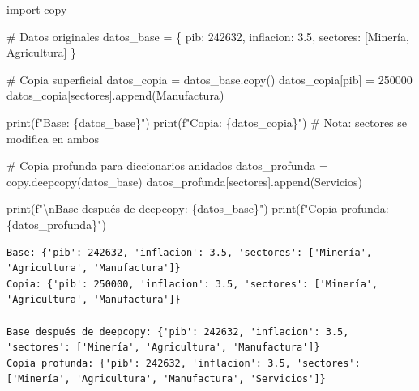 \documentclass[
  doc,
  floatsintext,
  longtable,
  a4paper,
  nolmodern,
  notxfonts,
  notimes,
  12pt,
  colorlinks=true,linkcolor=blue,citecolor=blue,urlcolor=blue]{apa7}
\newenvironment{Shaded}{\begin{snugshade}}{\end{snugshade}}
\newcommand{\BuiltInTok}[1]{\textcolor[rgb]{0.00,0.23,0.31}{#1}}
\newcommand{\CharTok}[1]{\textcolor[rgb]{0.13,0.47,0.30}{#1}}
\newcommand{\CommentTok}[1]{\textcolor[rgb]{0.37,0.37,0.37}{#1}}
\newcommand{\DecValTok}[1]{\textcolor[rgb]{0.68,0.00,0.00}{#1}}
\newcommand{\FloatTok}[1]{\textcolor[rgb]{0.68,0.00,0.00}{#1}}
\newcommand{\ImportTok}[1]{\textcolor[rgb]{0.00,0.46,0.62}{#1}}
\newcommand{\NormalTok}[1]{\textcolor[rgb]{0.00,0.23,0.31}{#1}}
\newcommand{\OperatorTok}[1]{\textcolor[rgb]{0.37,0.37,0.37}{#1}}
\newcommand{\SpecialCharTok}[1]{\textcolor[rgb]{0.37,0.37,0.37}{#1}}
\newcommand{\SpecialStringTok}[1]{\textcolor[rgb]{0.13,0.47,0.30}{#1}}
\newcommand{\StringTok}[1]{\textcolor[rgb]{0.13,0.47,0.30}{#1}}
\begin{document}
\begin{Shaded}
\begin{Highlighting}[]
\ImportTok{import}\NormalTok{ copy}

\CommentTok{\# Datos originales}
\NormalTok{datos\_base }\OperatorTok{=}\NormalTok{ \{}
    \StringTok{\textquotesingle{}pib\textquotesingle{}}\NormalTok{: }\DecValTok{242632}\NormalTok{,}
    \StringTok{\textquotesingle{}inflacion\textquotesingle{}}\NormalTok{: }\FloatTok{3.5}\NormalTok{,}
    \StringTok{\textquotesingle{}sectores\textquotesingle{}}\NormalTok{: [}\StringTok{\textquotesingle{}Minería\textquotesingle{}}\NormalTok{, }\StringTok{\textquotesingle{}Agricultura\textquotesingle{}}\NormalTok{]}
\NormalTok{\}}

\CommentTok{\# Copia superficial}
\NormalTok{datos\_copia }\OperatorTok{=}\NormalTok{ datos\_base.copy()}
\NormalTok{datos\_copia[}\StringTok{\textquotesingle{}pib\textquotesingle{}}\NormalTok{] }\OperatorTok{=} \DecValTok{250000}
\NormalTok{datos\_copia[}\StringTok{\textquotesingle{}sectores\textquotesingle{}}\NormalTok{].append(}\StringTok{\textquotesingle{}Manufactura\textquotesingle{}}\NormalTok{)}

\BuiltInTok{print}\NormalTok{(}\SpecialStringTok{f"Base: }\SpecialCharTok{\{}\NormalTok{datos\_base}\SpecialCharTok{\}}\SpecialStringTok{"}\NormalTok{)}
\BuiltInTok{print}\NormalTok{(}\SpecialStringTok{f"Copia: }\SpecialCharTok{\{}\NormalTok{datos\_copia}\SpecialCharTok{\}}\SpecialStringTok{"}\NormalTok{)}
\CommentTok{\# Nota: \textquotesingle{}sectores\textquotesingle{} se modifica en ambos}

\CommentTok{\# Copia profunda para diccionarios anidados}
\NormalTok{datos\_profunda }\OperatorTok{=}\NormalTok{ copy.deepcopy(datos\_base)}
\NormalTok{datos\_profunda[}\StringTok{\textquotesingle{}sectores\textquotesingle{}}\NormalTok{].append(}\StringTok{\textquotesingle{}Servicios\textquotesingle{}}\NormalTok{)}

\BuiltInTok{print}\NormalTok{(}\SpecialStringTok{f"}\CharTok{\textbackslash{}n}\SpecialStringTok{Base después de deepcopy: }\SpecialCharTok{\{}\NormalTok{datos\_base}\SpecialCharTok{\}}\SpecialStringTok{"}\NormalTok{)}
\BuiltInTok{print}\NormalTok{(}\SpecialStringTok{f"Copia profunda: }\SpecialCharTok{\{}\NormalTok{datos\_profunda}\SpecialCharTok{\}}\SpecialStringTok{"}\NormalTok{)}
\end{Highlighting}
\end{Shaded}

\begin{verbatim}
Base: {'pib': 242632, 'inflacion': 3.5, 'sectores': ['Minería', 'Agricultura', 'Manufactura']}
Copia: {'pib': 250000, 'inflacion': 3.5, 'sectores': ['Minería', 'Agricultura', 'Manufactura']}

Base después de deepcopy: {'pib': 242632, 'inflacion': 3.5, 'sectores': ['Minería', 'Agricultura', 'Manufactura']}
Copia profunda: {'pib': 242632, 'inflacion': 3.5, 'sectores': ['Minería', 'Agricultura', 'Manufactura', 'Servicios']}
\end{verbatim}
\end{document}
